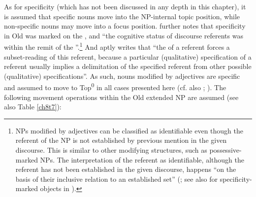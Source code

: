 \documentclass[output=paper,colorlinks,citecolor=brown]{langscibook}
\begin{document}
As for specificity (which has not been discussed in any depth in this
chapter), it is assumed that specific nouns move into the NP-internal
topic position, while non-specific nouns may move into a focus
position. \citet[61f]{Harries2014} further notes that specificity in Old
 was marked on the , and ``the cognitive status of
discourse referents was within the remit of the
''.\footnote{NPs modified by adjectives can be classified as identifiable even though the referent of the NP is not established by previous mention in the given discourse. This is similar to other modifying structures, such as possessive-marked NPs. The interpretation of the referent as identifiable, although the referent has not been established in the given discourse, happens ``on the basis of their inclusive relation to an established set'' (\citealp[595]{Schroeder2006}; see also
  \citealp[67]{Nilsson1985} for specificity-marked objects in ). } And
\citet[93]{Schroeder1999} aptly writes that ``the  of a referent
forces a subset-reading of this referent, because a particular
(qualitative) specification of a referent usually implies a delimitation
of the specified referent from other possible (qualitative)
specifications''. As such, nouns modified by adjectives are specific and
assumed to move to Top\textsuperscript{0} in all cases presented here (cf. also \citealp{Rizzi1997}; \citealp{Haegeman2000}). The following movement operations within the Old
 extended NP are assumed (see also Table \ref{ch8t7}):
\end{document}
